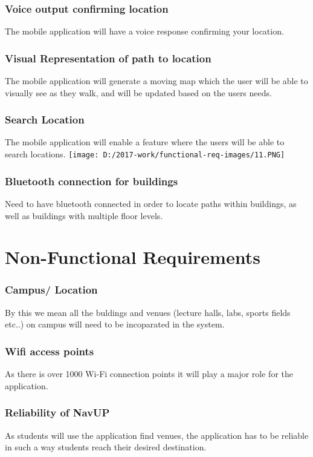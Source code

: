 \documentclass{article}
\begin{document}
\begin{center}
\subsubsection{Voice output confirming location}
The mobile application will have a voice response confirming your location.

\subsubsection{Visual Representation of path to location}
The mobile application will generate a moving map which the user will be able to visually see as they walk, and will be updated based on the users needs.
\newpage
\subsubsection{Search Location}
The mobile application will enable a feature where the users will be able to search locations.
\texttt{[image: D:/2017-work/functional-req-images/11.PNG]}

\newpage
\subsubsection{Bluetooth connection for buildings}
Need to have bluetooth connected in order to locate paths within buildings, as well as buildings with multiple floor levels.
\end{center}
\newpage
\centering
\section{Non-Functional Requirements}
 
\subsubsection{Campus/ Location}
By this we mean all the buldings and venues (lecture halls, labs, sports fields etc..) on campus will need to be incoparated in the system.
\subsubsection{Wifi access points}
As there is over 1000 Wi-Fi connection points it will play a major role for the application.
\subsubsection{Reliability of NavUP}
As students will use the application find venues, the application has to be reliable in such a way students reach their desired destination.
\end{document}
